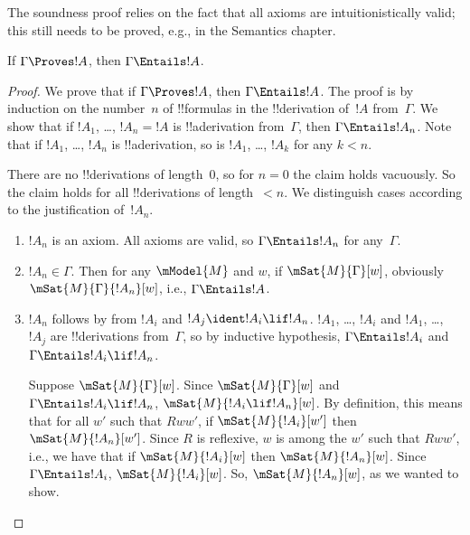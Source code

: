 \documentclass[../../../include/open-logic-section]{subfiles}
\begin{document}


\begin{editorial}
  The soundness proof relies on the fact that all axioms are
  intuitionistically valid; this still needs to be proved, e.g., in
  the Semantics chapter.
\end{editorial}

\begin{thm}[Soundness]
  If $\Gamma \Proves !A$, then $ \Gamma \Entails !A$.
\end{thm}

\begin{proof}
  We prove that if $\Gamma \Proves !A$, then $\Gamma \Entails !A$.
  The proof is by induction on the number~$n$ of !!{formula}s in the
  !!{derivation} of~$!A$ from~$\Gamma$.  We show that if $!A_1$,
  \dots, $!A_n = !A$ is !!a{derivation} from~$\Gamma$, then $\Gamma
  \Entails !A_n$. Note that if $!A_1$, \dots, $!A_n$ is
  !!a{derivation}, so is $!A_1$, \dots, $!A_k$ for any $k<n$.

  There are no !!{derivation}s of length~$0$, so for $n=0$ the claim
  holds vacuously. So the claim holds for all !!{derivation}s of
  length~$<n$. We distinguish cases according to the justification
  of~$!A_n$.
  
  \begin{enumerate}
  \item $!A_n$ is an axiom. All axioms are valid, so $\Gamma \Entails
    !A_n$ for any~$\Gamma$.
  \item $!A_n \in \Gamma$. Then for any $\mModel{M}$ and $w$, if
    $\mSat{M}{\Gamma}[w]$, obviously $\mSat{M}{\Gamma}{!A_n}[w]$,
    i.e., $\Gamma \Entails !A$.
  \item $!A_n$ follows by \MP{} from $!A_i$ and $!A_j \ident !A_i \lif
    !A_n$. $!A_1$, \dots, $!A_i$ and $!A_1$, \dots, $!A_j$ are
    !!{derivation}s from~$\Gamma$, so by inductive hypothesis, $\Gamma
    \Entails !A_i$ and $\Gamma \Entails !A_i \lif !A_n$.
    
    Suppose $\mSat{M}{\Gamma}[w]$. Since $\mSat{M}{\Gamma}[w]$ and
    $\Gamma \Entails !A_i \lif !A_n$, $\mSat{M}{!A_i \lif
      !A_n}[w]$. By definition, this means that for all $w'$ such that
    $Rww'$, if $\mSat{M}{!A_i}[w']$ then $\mSat{M}{!A_n}[w']$. Since
    $R$ is reflexive, $w$ is among the $w'$ such that $Rww'$, i.e., we
    have that if $\mSat{M}{!A_i}[w]$ then $\mSat{M}{!A_n}[w]$. Since
    $\Gamma \Entails !A_i$, $\mSat{M}{!A_i}[w]$. So,
    $\mSat{M}{!A_n}[w]$, as we wanted to show.
  \end{enumerate}
\end{proof}
\end{document}

